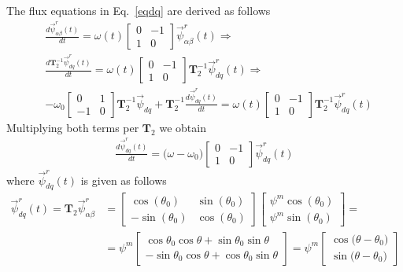 \documentclass[12pt,a4paper]{scrartcl}
\begin{document}
\begin{onehalfspace}
The flux equations in Eq.~\eqref{eqdq} are derived as follows
\begin{equation}
	\begin{aligned}
		& \frac{d\vec{\psi}^r_{\alpha\beta}(t)}{dt} = \omega(t) \begin{bmatrix} 0 & -1 \\ 1 & 0\end{bmatrix} \vec{\psi}^r_{\alpha\beta}(t) \Rightarrow \\[6pt]
		& \frac{d\mathbf{T}_2^{-1}\vec{\psi}^r_{dq}(t)}{dt} = \omega(t) \begin{bmatrix} 0 & -1 \\ 1 & 0\end{bmatrix} \mathbf{T}_2^{-1}\vec{\psi}^r_{dq}(t) \Rightarrow \\[6pt]
		&- \omega_0\begin{bmatrix} 0 & 1\\-1 & 0 \end{bmatrix}\mathbf{T}_2^{-1}\vec{\psi}_{dq} + \mathbf{T}_2^{-1}\frac{d\vec{\psi}^r_{dq}(t)}{dt} = \omega(t) \begin{bmatrix} 0 & -1 \\ 1 & 0\end{bmatrix} \mathbf{T}_2^{-1}\vec{\psi}^r_{dq}(t)
	\end{aligned}
\end{equation}
Multiplying both terms per $\mathbf{T}_2$ we obtain
\begin{equation}
	\begin{aligned}
		\frac{d\vec{\psi}^r_{dq}(t)}{dt} = \big(\omega-\omega_0\big)\begin{bmatrix} 0 & -1 \\ 1 & 0\end{bmatrix} \vec{\psi}^r_{dq}(t)
	\end{aligned}
\end{equation}
where $\vec{\psi}^r_{dq}(t)$ is given as follows
\begin{equation}
	\begin{aligned}
		\vec{\psi}^r_{dq}(t) = \mathbf{T}_2\vec{\psi}^r_{\alpha\beta} &= \begin{bmatrix} \cos(\theta_0) & \sin(\theta_0) \\[6pt] -\sin(\theta_0) & \cos(\theta_0) \end{bmatrix} \begin{bmatrix} \psi^m\cos(\theta_0) \\[6pt] \psi^m\sin(\theta_0) \end{bmatrix} = \\[6pt]
		&=\psi^m \begin{bmatrix} \cos\theta_0\cos\theta + \sin\theta_0\sin\theta \\[6pt] -\sin\theta_0\cos\theta+\cos\theta_0\sin\theta\end{bmatrix} =  \psi^m\begin{bmatrix} \cos\big(\theta -\theta_0\big) \\[6pt] \sin\big(\theta -\theta_0\big)\end{bmatrix}
	\end{aligned}
\end{equation}


\end{onehalfspace}
\end{document}
